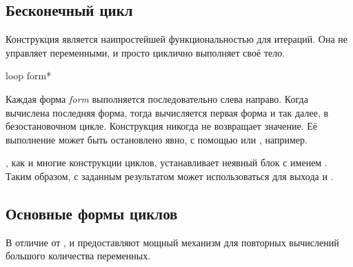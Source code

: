 \subsection{Бесконечный цикл}

Конструкция  является наипростейшей функциональностью для итераций.
Она не управляет переменными, и просто циклично выполняет своё тело.

\begin{defmac}
loop {form}*

Каждая форма \emph{form} выполняется последовательно слева направо.
Когда вычислена последняя форма, тогда вычисляется первая форма и так далее,
в безостановочном цикле.
Конструкция  никогда не возвращает значение. Её выполнение может быть
остановлено явно, с помощью  или , например.

, как и многие конструкции циклов, устанавливает неявный блок с именем
{\nil}.
Таким образом,  с заданным результатом может использоваться для
выхода и .
\end{defmac}

\subsection{Основные формы циклов}

В отличие от ,  и  предоставляют мощный механизм для
повторных вычислений большого количества переменных. 


